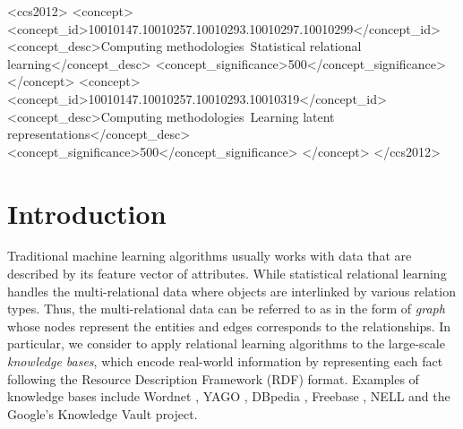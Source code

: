 \documentclass[9pt]{sig-alternate-05-2015}
\begin{document}
%
%

\begin{CCSXML}
<ccs2012>
<concept>
<concept_id>10010147.10010257.10010293.10010297.10010299</concept_id>
<concept_desc>Computing methodologies~Statistical relational learning</concept_desc>
<concept_significance>500</concept_significance>
</concept>
<concept>
<concept_id>10010147.10010257.10010293.10010319</concept_id>
<concept_desc>Computing methodologies~Learning latent representations</concept_desc>
<concept_significance>500</concept_significance>
</concept>
</ccs2012>
\end{CCSXML}



%
%

%
%
\printccsdesc



\section{Introduction}
Traditional machine learning algorithms usually works with data that are described by its feature vector of attributes. While statistical relational learning handles the multi-relational data where objects are interlinked by various relation types. Thus, the multi-relational data can be referred to as in the form of \emph{graph} whose nodes represent the entities and edges corresponds to the relationships. In particular, we consider to apply relational learning algorithms to the large-scale \emph{knowledge bases}, which encode real-world information by representing each fact following the Resource Description Framework (RDF) format.  Examples of knowledge bases include Wordnet \cite{miller_wordnet:_1995}, YAGO \cite{suchanek_yago:_2007}, DBpedia \cite{lehmann_dbpedialarge-scale_2015}, Freebase \cite{bollacker_freebase:_2008}, NELL \cite{betteridge_toward_2009} and the Google's Knowledge Vault project\cite{dong_knowledge_2014}.  

\end{document}
